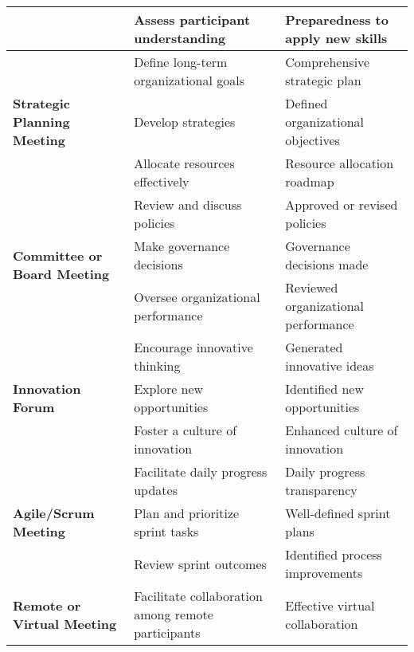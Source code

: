 \begin{table*}[ht]
\begin{tabularx}{\textwidth}{m{4cm}XX}
            & Assess participant understanding & Preparedness to apply new skills \\
        \midrule
        \multirow{3}{*}{\textbf{Strategic Planning Meeting}} 
            & Define long-term organizational goals & Comprehensive strategic plan \\
        
            & Develop strategies & Defined organizational objectives \\
        
            & Allocate resources effectively & Resource allocation roadmap \\
        \midrule
        \multirow{3}{*}{\textbf{Committee or Board Meeting}} 
            & Review and discuss policies & Approved or revised policies \\
        
            & Make governance decisions & Governance decisions made \\
        
            & Oversee organizational performance & Reviewed organizational performance \\
        \midrule
        \multirow{3}{*}{\textbf{Innovation Forum}} 
            & Encourage innovative thinking & Generated innovative ideas \\
        
            & Explore new opportunities & Identified new opportunities \\
        
            & Foster a culture of innovation & Enhanced culture of innovation \\
        \midrule
        \multirow{3}{*}{\textbf{Agile/Scrum Meeting}} 
            & Facilitate daily progress updates & Daily progress transparency \\
        
            & Plan and prioritize sprint tasks & Well-defined sprint plans \\
        
            & Review sprint outcomes & Identified process improvements \\
        \midrule
        \multirow{3}{*}{\textbf{Remote or Virtual Meeting}} 
            & Facilitate collaboration among remote participants & Effective virtual collaboration \\
        

\end{tabularx}
\end{table*}
